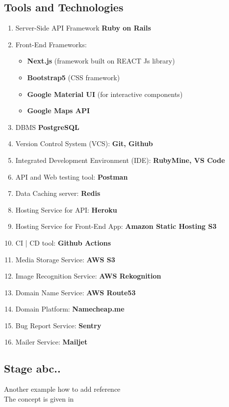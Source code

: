 \subsection{Tools and Technologies}
\begin{enumerate}
	\item Server-Side API Framework \textbf{Ruby on Rails}
	\item Front-End Frameworks:
	\begin{itemize}
		\item \textbf{Next.js} (framework built on REACT Js library)
		\item \textbf{Bootstrap5} (CSS framework)
		\item \textbf{Google Material UI} (for interactive components)
		\item \textbf{Google Maps API}
	\end{itemize}
	\item DBMS \textbf{PostgreSQL}
	\item Version Control System (VCS): \textbf{Git, Github}
	\item Integrated Development Environment (IDE): \textbf{RubyMine, VS Code}
	\item API and Web testing tool: \textbf{Postman}
	\item Data Caching server: \textbf{Redis}
	\item Hosting Service for API: \textbf{Heroku}
	\item Hosting Service for Front-End App: \textbf{Amazon Static Hosting S3}
	\item CI | CD tool: \textbf{Github Actions}
	\item Media Storage Service: \textbf{AWS S3}
	\item Image Recognition Service: \textbf{AWS Rekognition}
	\item Domain Name Service: \textbf{AWS Route53}
	\item Domain Platform: \textbf{Namecheap.me}
	\item Bug Report Service: \textbf{Sentry}
	\item Mailer Service: \textbf{Mailjet}
	
\end{enumerate}


\subsection{Stage abc..}
Another example how to add reference \\
The concept is given in \citep{inth}


